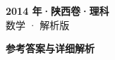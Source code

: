 \documentclass[zihao=-4, a4paper]{ctexart}
\begin{document}
\begin{center}
  {\Large\bfseries 2014 年·陕西卷·理科}\\[4pt]
  {\large 数学 · 解析版}
\end{center}
\medskip
{}

\clearpage
{}
\begin{center}{\Large\bfseries 参考答案与详细解析}\end{center}
\medskip

\end{document}

